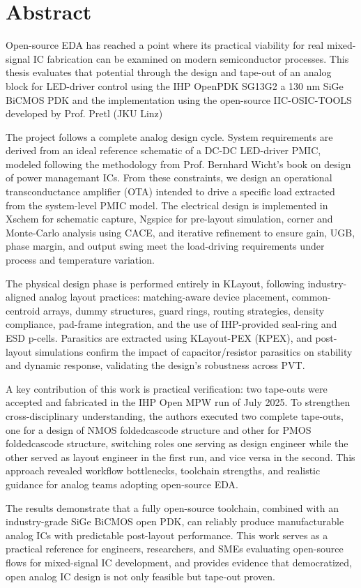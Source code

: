 \chapter{Abstract}

Open-source EDA has reached a point where its practical viability for real mixed-signal IC fabrication can be examined on modern semiconductor processes. This thesis evaluates that potential through the design and tape-out of an analog block for LED-driver control using the IHP OpenPDK SG13G2 a 130 nm SiGe BiCMOS PDK and the implementation using the open-source IIC-OSIC-TOOLS developed by Prof. Pretl (JKU Linz)

The project follows a complete analog design cycle. System requirements are derived from an ideal reference schematic of a DC-DC LED-driver PMIC, modeled following the methodology from Prof. Bernhard Wicht’s book on design of power managemant ICs. From these constraints, we design an operational transconductance amplifier (OTA) intended to drive a specific load extracted from the system-level PMIC model. The electrical design is implemented in Xschem for schematic capture, Ngspice for pre-layout simulation, corner and Monte-Carlo analysis using CACE, and iterative refinement to ensure gain, UGB, phase margin, and output swing meet the load-driving requirements under process and temperature variation.

The physical design phase is performed entirely in KLayout, following industry-aligned analog layout practices: matching-aware device placement, common-centroid arrays, dummy structures, guard rings, routing strategies, density compliance, pad-frame integration, and the use of IHP-provided seal-ring and ESD p-cells. Parasitics are extracted using KLayout-PEX (KPEX), and post-layout simulations confirm the impact of capacitor/resistor parasitics on stability and dynamic response, validating the design’s robustness across PVT.

A key contribution of this work is practical verification: two tape-outs were accepted and fabricated in the IHP Open MPW run of July 2025. To strengthen cross-disciplinary understanding, the authors executed two complete tape-outs, one for a design of NMOS foldedcascode structure and other for PMOS foldedcascode structure, switching roles one serving as design engineer while the other served as layout engineer in the first run, and vice versa in the second. This approach revealed workflow bottlenecks, toolchain strengths, and realistic guidance for analog teams adopting open-source EDA.

The results demonstrate that a fully open-source toolchain, combined with an industry-grade SiGe BiCMOS open PDK, can
reliably produce manufacturable analog ICs with predictable post-layout performance. This work serves as a practical
reference for engineers, researchers, and SMEs evaluating open-source flows for mixed-signal IC development, and
provides evidence that democratized, open analog IC design is not only feasible but tape-out proven.


